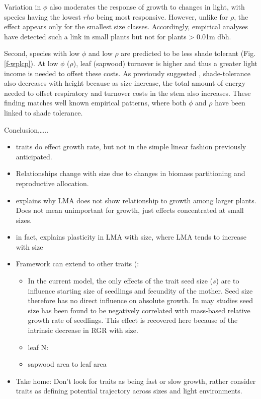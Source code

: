 \documentclass[12pt, a4paper]{article}
\begin{document}
Variation in \(\phi\) also moderates the response of growth to changes
in light, with species having the lowest \(rho\) being most responsive.
However, unlike for \(\rho\), the effect appears only for the smallest
size classes. Accordingly, empirical analyses have detected such a link
in small plants but not for plants \textgreater{} 0.01m
dbh\citep{ruger_functional_2012}.

Second, species with low \(\phi\) and low \(\rho\) are predicted to be
less shade tolerant (Fig. \ref{f-wplcp}). At low \(\phi\) (\(\rho\)),
leaf (sapwood) turnover is higher and thus a greater light income is
needed to offset these costs. As previously suggested
\citep{givnish_adaptation_1988}, shade-tolerance also decreases with
height because as size increase, the total amount of energy needed to
offset respiratory and turnover costs in the stem also increases. These
finding matches well known empirical patterns, where both \(\phi\) and
\(\rho\) have been linked to shade tolerance\citep{poorter_leaf_2006, lusk_ontogenetic_2008,osunkoya_light_1996}.

Conclusion,\ldots{}..

\begin{itemize}
\itemsep1pt\parskip0pt
\item
  traits do effect growth rate, but not in the simple linear fashion
  previously anticipated.
\item
  Relationships change with size due to changes in biomass partitioning
  and reproductive allocation.
\item
  explains why LMA does not show relationship to growth among larger
  plants. Does not mean unimportant for growth, just effects
  concentrated at small sizes.
\item
  in fact, explains plasticity in LMA with size, where LMA tends to
  increase with size \citep{thomas_asymptotic_1999;
  @thomas_photosynthetic_2010}
\item
  Framework can extend to other traits (:

  \begin{itemize}
  \itemsep1pt\parskip0pt
  \item
    In the current model, the only effects of the trait seed size
    (\(s\)) are to influence starting size of seedlings and fecundity of
    the mother. Seed size therefore has no direct influence on absolute
    growth. In may studies seed size has been found to be negatively
    correlated with mass-based relative growth rate of seedlings. This
    effect is recovered here because of the intrinsic decrease in RGR
    with size.
  \item
    leaf N:
  \item
    sapwood area to leaf area
  \end{itemize}
\item
  Take home: Don't look for traits as being fast or slow growth, rather
  consider traits as defining potential trajectory across sizes and
  light environments.
\end{itemize}
\end{document}
